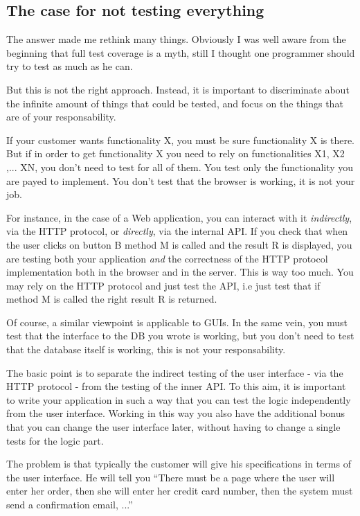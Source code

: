 \documentclass[10pt,a4paper,english]{article}
\begin{document}
\subsection*{The case for not testing everything}

The answer made me rethink many things. Obviously I was well aware
from the beginning that full test coverage is a myth, still I thought
one programmer should try to test as much as he can.

But this is not the right approach. Instead, it is important to
discriminate about the infinite amount of things that could be
tested, and focus on the things that are of your responsability.

If your customer wants functionality X, you must be sure functionality X
is there. But if in order to get functionality X you need to rely on
functionalities X1, X2 ,... XN, you don't need to test for all
of them. You test only the functionality you are payed to
implement. You don't test that the browser is working, it is
not your job.

For instance, in the case of a Web application, 
you can interact with it \emph{indirectly}, via the HTTP protocol, or \emph{directly}, 
via the internal API. If you check that when the user clicks
on button B method M is called and the result R is displayed, you are
testing both your application \emph{and} the correctness of the
HTTP protocol implementation both in the browser and in the server. This is
way too much. You may rely on the HTTP protocol and just test the API, i.e
just test that if method M is called the right result R is returned.

Of course, a similar viewpoint is applicable to GUIs. In the same
vein, you must test that the interface to the DB you wrote is working, but
you don't need to test that the database itself is working, this
is not your responsability.

The basic point is to separate the indirect testing of the user 
interface - via the HTTP protocol - from the testing of the inner API. 
To this aim, it is important to write your 
application in such a way that you can test the logic independently 
from the user interface. Working in this way you also have the additional 
bonus that you can change the user interface later, without having to 
change a single tests for the logic part.

The problem is that typically the customer will give his specifications
in terms of the user interface. He will tell you ``There must be a page where 
the user will enter her order, then she will enter her credit card number,
then the system must send a confirmation email, ...''
\end{document}
